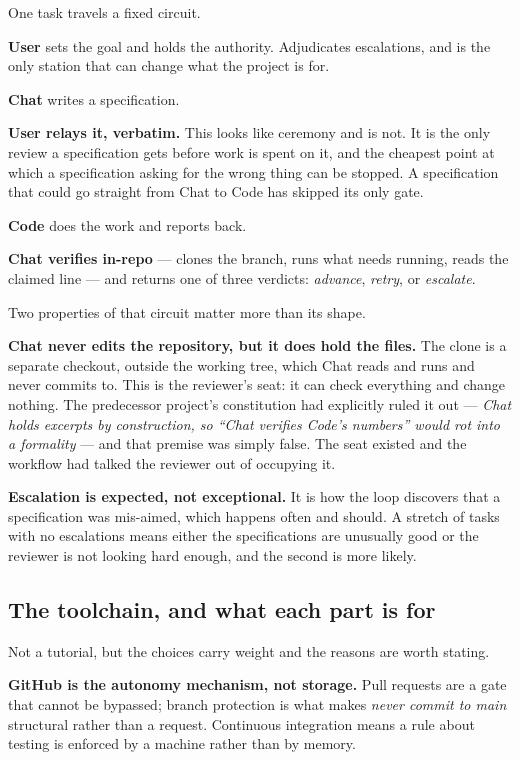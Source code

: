 One task travels a fixed circuit.

\textbf{User} sets the goal and holds the authority. Adjudicates escalations, and is the only station that can change what the project is for.

\textbf{Chat} writes a specification.

\textbf{User relays it, verbatim.} This looks like ceremony and is not. It is the only review a specification gets before work is spent on it, and the cheapest point at which a specification asking for the wrong thing can be stopped. A specification that could go straight from Chat to Code has skipped its only gate.

\textbf{Code} does the work and reports back.

\textbf{Chat verifies in-repo} --- clones the branch, runs what needs running, reads the claimed line --- and returns one of three verdicts: \textit{advance}, \textit{retry}, or \textit{escalate}.

Two properties of that circuit matter more than its shape.

\textbf{Chat never edits the repository, but it does hold the files.} The clone is a separate checkout, outside the working tree, which Chat reads and runs and never commits to. This is the reviewer's seat: it can check everything and change nothing. The predecessor project's constitution had explicitly ruled it out --- \textit{Chat holds excerpts by construction, so ``Chat verifies Code's numbers'' would rot into a formality} --- and that premise was simply false. The seat existed and the workflow had talked the reviewer out of occupying it.

\textbf{Escalation is expected, not exceptional.} It is how the loop discovers that a specification was mis-aimed, which happens often and should. A stretch of tasks with no escalations means either the specifications are unusually good or the reviewer is not looking hard enough, and the second is more likely.

\subsection{The toolchain, and what each part is for}

Not a tutorial, but the choices carry weight and the reasons are worth stating.

\textbf{GitHub is the autonomy mechanism, not storage.} Pull requests are a gate that cannot be bypassed; branch protection is what makes \textit{never commit to main} structural rather than a request. Continuous integration means a rule about testing is enforced by a machine rather than by memory.

